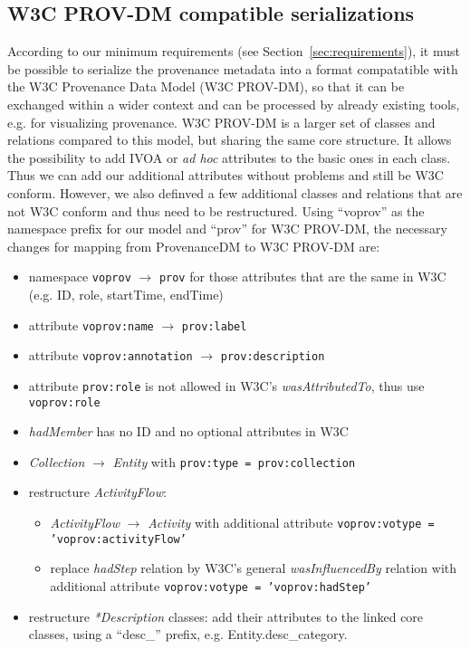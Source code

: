 \subsection{W3C PROV-DM compatible serializations}\label{sec:w3cserialization}
According to our minimum requirements (see Section~\ref{sec:requirements}), it must be possible to
serialize the provenance metadata into a format compatatible with the W3C Provenance Data Model (W3C PROV-DM), so that it can be exchanged within a wider context and can be processed by already existing tools, e.g. for visualizing provenance.
W3C PROV-DM is a larger set of classes and relations compared to this model, but sharing the same core structure. It allows the possibility to add IVOA or \textit{ad hoc} attributes to the basic ones in each class. Thus we can add our additional attributes without problems and still be W3C conform. However, we also definved a few additional classes and relations that are not W3C conform and thus need to be restructured.
Using ``voprov'' as the namespace prefix for our model and ``prov'' for W3C PROV-DM, the necessary changes for mapping from ProvenanceDM to W3C PROV-DM are:

\begin{itemize}
\item namespace \texttt{voprov} $\rightarrow$ \texttt{prov} for those attributes that are the same in W3C (e.g. ID, role, startTime, endTime)
\item attribute \texttt{voprov:name} $\rightarrow$ \texttt{prov:label}
\item attribute \texttt{voprov:annotation} $\rightarrow$ \texttt{prov:description}
\item attribute \texttt{prov:role} is not allowed in W3C's \emph{wasAttributedTo}, thus use \texttt{voprov:role}
\item \emph{hadMember} has no ID and no optional attributes in W3C
\item \emph{Collection} $\rightarrow$ \emph{Entity} with \texttt{prov:type = prov:collection}
\item restructure \emph{ActivityFlow}:
	\begin{itemize}
	\item \emph{ActivityFlow} $\rightarrow$ \emph{Activity} with additional attribute \texttt{voprov:votype = 'voprov:activityFlow'}
	\item replace \emph{hadStep} relation by W3C's general \emph{wasInfluencedBy} relation with additional attribute \texttt{voprov:votype = 'voprov:hadStep'}
	\end{itemize}
\item restructure \emph{*Description} classes: add their attributes to the linked core classes, using a ``desc\_'' prefix, e.g. Entity.desc\_category.

\end{itemize}

